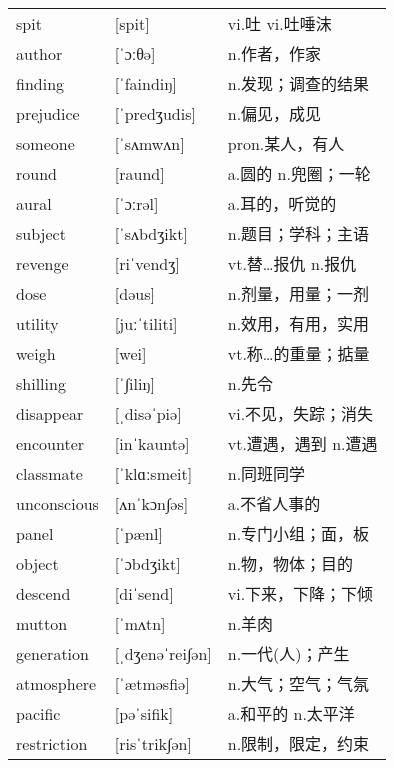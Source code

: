 \documentclass[a4paper]{article}
\begin{document}
\section{}
\begin{tabular}{l l l}

spit & [spit] & vi.吐 vi.吐唾沫 \\
author & [ˈɔːθə] & n.作者，作家 \\
finding & [ˈfaindiŋ] & n.发现；调查的结果 \\
prejudice & [ˈpredʒudis] & n.偏见，成见 \\
someone & [ˈsʌmwʌn] & pron.某人，有人 \\
round & [raund] & a.圆的 n.兜圈；一轮 \\
aural & [ˈɔːrəl] & a.耳的，听觉的 \\
subject & [ˈsʌbdʒikt] & n.题目；学科；主语 \\
revenge & [riˈvendʒ] & vt.替…报仇 n.报仇 \\
dose & [dəus] & n.剂量，用量；一剂 \\
utility & [juːˈtiliti] & n.效用，有用，实用 \\
weigh & [wei] & vt.称…的重量；掂量 \\
shilling & [ˈ∫iliŋ] & n.先令 \\
disappear & [ˌdisəˈpiə] & vi.不见，失踪；消失 \\
encounter & [inˈkauntə] & vt.遭遇，遇到 n.遭遇 \\
classmate & [ˈklɑːsmeit] & n.同班同学 \\
unconscious & [ʌnˈkɔn∫əs] & a.不省人事的 \\
panel & [ˈpænl] & n.专门小组；面，板 \\
object & [ˈɔbdʒikt] & n.物，物体；目的 \\
descend & [diˈsend] & vi.下来，下降；下倾 \\
mutton & [ˈmʌtn] & n.羊肉 \\
generation & [ˌdʒenəˈrei∫ən] & n.一代(人)；产生 \\
atmosphere & [ˈætməsfiə] & n.大气；空气；气氛 \\
pacific & [pəˈsifik] & a.和平的 n.太平洋 \\
restriction & [risˈtrik∫ən] & n.限制，限定，约束 \\

\end{tabular}
\end{document}
